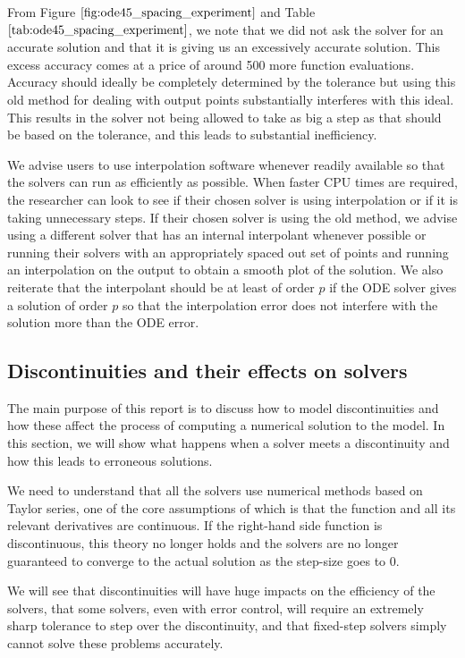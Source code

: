 From Figure $\ref{fig:ode45_spacing_experiment}$ and Table $\ref{tab:ode45_spacing_experiment}$, we note that we did not ask the solver for an accurate solution and that it is giving us an excessively accurate solution. This excess accuracy comes at a price of around 500 more function evaluations. Accuracy should ideally be completely determined by the tolerance but using this old method for dealing with output points substantially interferes with this ideal. This results in the solver not being allowed to take as big a step as that should be based on the tolerance, and this leads to substantial inefficiency. 

We advise users to use interpolation software whenever readily available so that the solvers can run as efficiently as possible. When faster CPU times are required, the researcher can look to see if their chosen solver is using interpolation or if it is taking unnecessary steps. If their chosen solver is using the old method, we advise using a different solver that has an internal interpolant whenever possible or running their solvers with an appropriately spaced out set of points and running an interpolation on the output to obtain a smooth plot of the solution. We also reiterate that the interpolant should be at least of order $p$ if the ODE solver gives a solution of order $p$ so that the interpolation error does not interfere with the solution more than the ODE error.

\subsection{Discontinuities and their effects on solvers}
\label{subsection:effect_of_discontinuity}
The main purpose of this report is to discuss how to model discontinuities and how these affect the process of computing a numerical solution to the model. In this section, we will show what happens when a solver meets a discontinuity and how this leads to erroneous solutions.

We need to understand that all the solvers use numerical methods based on Taylor series, one of the core assumptions of which is that the function and all its relevant derivatives are continuous. If the right-hand side function is discontinuous, this theory no longer holds and the solvers are no longer guaranteed to converge to the actual solution as the step-size goes to 0.

We will see that discontinuities will have huge impacts on the efficiency of the solvers, that some solvers, even with error control, will require an extremely sharp tolerance to step over the discontinuity, and that fixed-step solvers simply cannot solve these problems accurately. 

